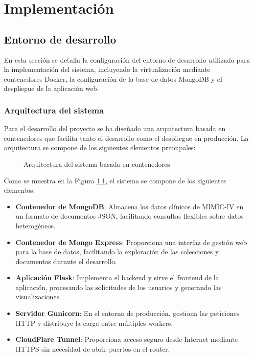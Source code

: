 \chapter{Implementación}

\section{Entorno de desarrollo}

En esta sección se detalla la configuración del entorno de desarrollo utilizado para la implementación del sistema, incluyendo la virtualización mediante contenedores Docker, la configuración de la base de datos MongoDB y el despliegue de la aplicación web.

\subsection{Arquitectura del sistema}

Para el desarrollo del proyecto se ha diseñado una arquitectura basada en contenedores que facilita tanto el desarrollo como el despliegue en producción. La arquitectura se compone de los siguientes elementos principales:

\begin{figure}[h]
\centering
\caption{Arquitectura del sistema basada en contenedores}
\label{fig:arquitectura}
\end{figure}

Como se muestra en la Figura \ref{fig:arquitectura}, el sistema se compone de los siguientes elementos:

\begin{itemize}
    \item \textbf{Contenedor de MongoDB}: Almacena los datos clínicos de MIMIC-IV en un formato de documentos JSON, facilitando consultas flexibles sobre datos heterogéneos.
    
    \item \textbf{Contenedor de Mongo Express}: Proporciona una interfaz de gestión web para la base de datos, facilitando la exploración de las colecciones y documentos durante el desarrollo.
    
    \item \textbf{Aplicación Flask}: Implementa el backend y sirve el frontend de la aplicación, procesando las solicitudes de los usuarios y generando las visualizaciones.
    
    \item \textbf{Servidor Gunicorn}: En el entorno de producción, gestiona las peticiones HTTP y distribuye la carga entre múltiples workers.
    
    \item \textbf{CloudFlare Tunnel}: Proporciona acceso seguro desde Internet mediante HTTPS sin necesidad de abrir puertos en el router.
\end{itemize}

